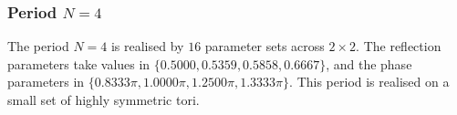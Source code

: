 \par
\subsubsection{Period $N = 4$}
The period $N=4$ is realised by $16$ parameter sets across $2\times2$. The reflection parameters take values in $\{0.5000, 0.5359, 0.5858, 0.6667\}$, and the phase parameters in $\{0.8333\pi, 1.0000\pi, 1.2500\pi, 1.3333\pi\}$. This period is realised on a small set of highly symmetric
tori.
